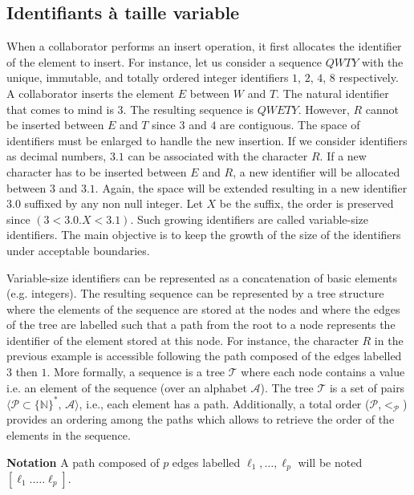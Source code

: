 \subsection{Identifiants à taille variable}
When a collaborator performs an insert operation, it first allocates the
identifier of the element to insert. For instance, let us consider a sequence
$QWTY$ with the unique, immutable, and totally ordered integer identifiers $1$,
$2$, $4$, $8$ respectively. A collaborator inserts the element $E$ between $W$
and $T$. The natural identifier that comes to mind is $3$. The resulting
sequence is $QWETY$. However, $R$ cannot be inserted between $E$ and $T$ since
$3$ and $4$ are contiguous. The space of identifiers must be enlarged to handle
the new insertion. If we consider identifiers as decimal numbers, $3.1$ can be
associated with the character $R$. If a new character has to be inserted
between $E$ and $R$, a new identifier will be allocated between $3$ and
$3.1$. Again, the space will be extended resulting in a new identifier $3.0$
suffixed by any non null integer. Let $X$ be the suffix, the order is preserved
since $(3 < 3.0.X < 3.1)$. Such growing identifiers are called variable-size
identifiers. The main objective is to keep the growth of the size of the
identifiers under acceptable boundaries.

Variable-size identifiers can be represented as a concatenation of basic
elements (e.g. integers). The resulting sequence can be represented by a tree
structure where the elements of the sequence are stored at the nodes and where
the edges of the tree are labelled such that a path from the root to a node
represents the identifier of the element stored at this node. For instance, the
character $R$ in the previous example is accessible following the path composed
of the edges labelled $3$ then $1$. More formally, a sequence is a tree
$\mathcal{T}$ where each node contains a value i.e. an element of the sequence
(over an alphabet $\mathcal{A}$). The tree $\mathcal{T}$ is a set of pairs
$\langle\mathcal{P}\subset\{\mathbb{N}\}^*,\, \mathcal{A} \rangle$, i.e., each
element has a path. Additionally, a total order
($\mathcal{P}$,$<_{\mathcal{P}}$) provides an ordering among the paths which
allows to retrieve the order of the elements in the sequence.

\noindent \textbf{Notation} A path composed of $p$ edges labelled
$\ell_1,\ldots,\ell_p$ will be noted $[\ell_1.\ldots.\ell_p]$.

